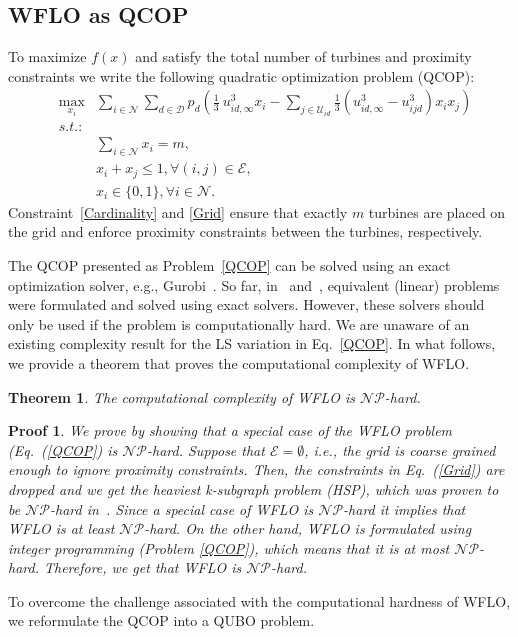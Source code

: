 \documentclass[preprint,12pt]{elsarticle}
\newtheorem{mythm}{Theorem}
\newtheorem{myproof}{Proof}
\begin{document}
\subsection{WFLO as QCOP}

To 
maximize $f(x)$ and satisfy the total number of turbines and proximity 
constraints we write
the following quadratic optimization problem (QCOP):
\begin{eqnarray} \label{QCOP}
&\max_{x_i}^{}& \sum_{i \in \mathcal{N}}^{} \sum_{d \in \mathcal{D}}^{} p_d ( \frac{1}{3} \ u_{id, \infty}^3 x_i  - \sum_{j \in \mathcal{U}_{id}}^{} \frac{1}{3}(u_{id, \infty} ^3 - u_{ijd}^3)x_i x_j)   \\
&s.t.:& \nonumber\\
&\mbox{       }& \sum_{i \in \mathcal{N}}^{} x_i = m,\label{Cardinality}\\
&\mbox{       }& x_i + x_j \leq 1,   \forall (i,j) \in \mathcal{E}, \label{Grid}\\
&\mbox{       }& x_i \in \{0,1\},     \forall i \in \mathcal{N}.
\end{eqnarray} Constraint~\ref{Cardinality} and \ref{Grid} ensure that exactly $m$ turbines are placed on the grid
and enforce proximity constraints between the turbines, respectively. 

The QCOP presented as Problem~\ref{QCOP} can be solved using an exact optimization solver, e.g., Gurobi~\cite{gurobi}. 
So far, in~\cite{Zhang2014} and~\cite{donovan2005wind}, equivalent (linear) problems were formulated and solved using 
exact solvers. However, these solvers should only be used if the problem is computationally hard.
We are unaware of an existing complexity result for the LS variation in Eq.~\ref{QCOP}. In what follows, we provide
a theorem that proves the computational complexity of WFLO. 
\begin{mythm}
	The computational complexity of WFLO is $\mathcal{NP}$-hard. 
\end{mythm}
\begin{myproof}
We prove by showing that a special case of the WFLO problem (Eq.~(\ref{QCOP}) is
$\mathcal{NP}$-hard. Suppose that $\mathcal{E} = \emptyset$, i.e., the grid is coarse grained enough to ignore proximity constraints. Then, the constraints in Eq.~(\ref{Grid})
are dropped and we get the heaviest k-subgraph problem (HSP), which was proven to be $\mathcal{NP}$-hard in~\cite{billionnet2005different}.
Since a special case of WFLO is  $\mathcal{NP}$-hard it implies that WFLO is at least $\mathcal{NP}$-hard. On the other hand,
WFLO is formulated using integer programming (Problem \ref{QCOP}), which means that it is at most $\mathcal{NP}$-hard. Therefore, we get that WFLO is $\mathcal{NP}$-hard.
	\end{myproof} To overcome the challenge associated with the computational hardness of WFLO,
we reformulate the QCOP into a QUBO problem.  
\end{document}
